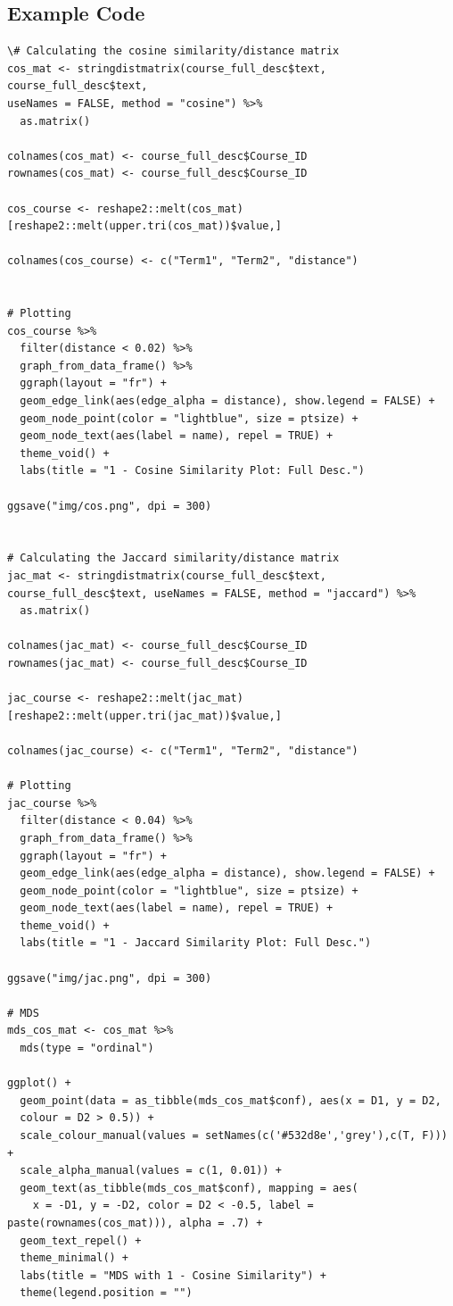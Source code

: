 \begin{appendices}
\chapter{Example Code} 

\begin{lstlisting}
\# Calculating the cosine similarity/distance matrix
cos_mat <- stringdistmatrix(course_full_desc$text, course_full_desc$text, 
useNames = FALSE, method = "cosine") %>% 
  as.matrix()

colnames(cos_mat) <- course_full_desc$Course_ID
rownames(cos_mat) <- course_full_desc$Course_ID

cos_course <- reshape2::melt(cos_mat)[reshape2::melt(upper.tri(cos_mat))$value,]

colnames(cos_course) <- c("Term1", "Term2", "distance")


# Plotting 
cos_course %>% 
  filter(distance < 0.02) %>% 
  graph_from_data_frame() %>%
  ggraph(layout = "fr") +
  geom_edge_link(aes(edge_alpha = distance), show.legend = FALSE) +
  geom_node_point(color = "lightblue", size = ptsize) +
  geom_node_text(aes(label = name), repel = TRUE) +
  theme_void() + 
  labs(title = "1 - Cosine Similarity Plot: Full Desc.")

ggsave("img/cos.png", dpi = 300)


# Calculating the Jaccard similarity/distance matrix
jac_mat <- stringdistmatrix(course_full_desc$text, course_full_desc$text, useNames = FALSE, method = "jaccard") %>% 
  as.matrix()

colnames(jac_mat) <- course_full_desc$Course_ID
rownames(jac_mat) <- course_full_desc$Course_ID

jac_course <- reshape2::melt(jac_mat)[reshape2::melt(upper.tri(jac_mat))$value,]

colnames(jac_course) <- c("Term1", "Term2", "distance")

# Plotting
jac_course %>% 
  filter(distance < 0.04) %>% 
  graph_from_data_frame() %>%
  ggraph(layout = "fr") +
  geom_edge_link(aes(edge_alpha = distance), show.legend = FALSE) +
  geom_node_point(color = "lightblue", size = ptsize) +
  geom_node_text(aes(label = name), repel = TRUE) +
  theme_void() + 
  labs(title = "1 - Jaccard Similarity Plot: Full Desc.")

ggsave("img/jac.png", dpi = 300)

# MDS
mds_cos_mat <- cos_mat %>% 
  mds(type = "ordinal")

ggplot() +
  geom_point(data = as_tibble(mds_cos_mat$conf), aes(x = D1, y = D2, 
  colour = D2 > 0.5)) +
  scale_colour_manual(values = setNames(c('#532d8e','grey'),c(T, F))) +
  scale_alpha_manual(values = c(1, 0.01)) +
  geom_text(as_tibble(mds_cos_mat$conf), mapping = aes(
    x = -D1, y = -D2, color = D2 < -0.5, label = paste(rownames(cos_mat))), alpha = .7) +
  geom_text_repel() +
  theme_minimal() +
  labs(title = "MDS with 1 - Cosine Similarity") +
  theme(legend.position = "")


\end{lstlisting}
\end{appendices}
